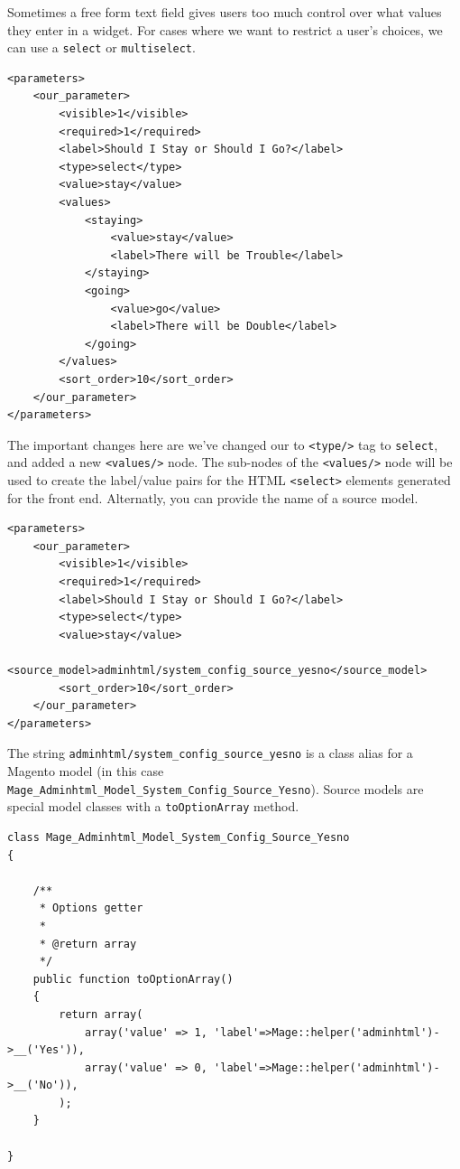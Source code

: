 \documentclass[oneside]{book}
\begin{document}
Sometimes a free form text field gives users too much control over what values they enter in a widget.  For cases where we want to restrict a user's choices, we can use a \footnotesize\texttt{select} \normalsize  or \footnotesize\texttt{multiselect}\normalsize.

\begin{lstlisting}
<parameters>
    <our_parameter>
        <visible>1</visible>
        <required>1</required>
        <label>Should I Stay or Should I Go?</label>
        <type>select</type>
        <value>stay</value>
        <values>
            <staying>
                <value>stay</value>
                <label>There will be Trouble</label>
            </staying>
            <going>
                <value>go</value>
                <label>There will be Double</label>
            </going>
        </values>
        <sort_order>10</sort_order>
    </our_parameter>
</parameters>

\end{lstlisting}


The important changes here are we've changed our to \footnotesize\texttt{\textless type/\textgreater } \normalsize  tag to \footnotesize\texttt{select}\normalsize, and added a new \footnotesize\texttt{\textless values/\textgreater } \normalsize  node.  The sub-nodes of the \footnotesize\texttt{\textless values/\textgreater } \normalsize  node will be used to create the label/value pairs for the HTML \footnotesize\texttt{\textless select\textgreater } \normalsize  elements generated for the front end.  Alternatly, you can provide the name of a source model.

\begin{lstlisting}
<parameters>
    <our_parameter>
        <visible>1</visible>
        <required>1</required>
        <label>Should I Stay or Should I Go?</label>
        <type>select</type>
        <value>stay</value>
        <source_model>adminhtml/system_config_source_yesno</source_model>
        <sort_order>10</sort_order>
    </our_parameter>
</parameters>

\end{lstlisting}


The string \footnotesize\texttt{adminhtml/system\_config\_source\_yesno} \normalsize  is a class alias for a Magento model (in this case \footnotesize\texttt{Mage\_Adminhtml\_Model\_System\_Config\_Source\_Yesno}\normalsize). Source models are special model classes with a \footnotesize\texttt{toOptionArray} \normalsize  method.  

\begin{lstlisting}
class Mage_Adminhtml_Model_System_Config_Source_Yesno
{

    /**
     * Options getter
     *
     * @return array
     */
    public function toOptionArray()
    {
        return array(
            array('value' => 1, 'label'=>Mage::helper('adminhtml')->__('Yes')),
            array('value' => 0, 'label'=>Mage::helper('adminhtml')->__('No')),
        );
    }

}

\end{lstlisting}
\end{document}
